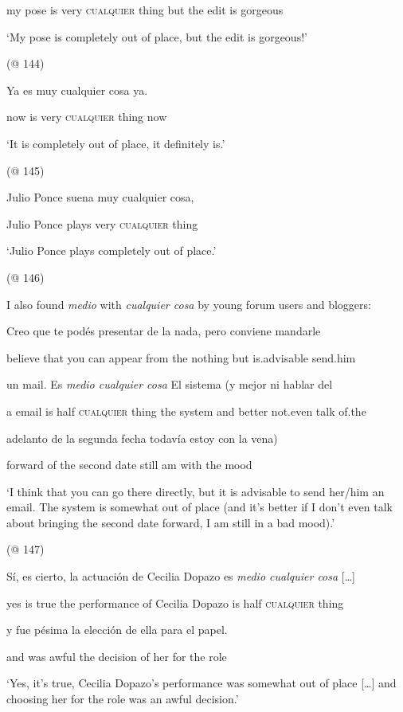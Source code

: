 \documentclass[output=paper]{langscibook}
\begin{document}
    my  pose  is  very  \textsc{cualquier}  thing  but  the  edit  is  gorgeous

    ‘My pose is completely out of place, but the edit is gorgeous!’

    (@ 144)

    Ya  es  muy  cualquier  cosa  ya.

    now  is  very  \textsc{cualquier}  thing  now

    ‘It is completely out of place, it definitely is.’

    (@ 145)

    Julio Ponce  suena  muy  cualquier  cosa,

    Julio Ponce  plays  very  \textsc{cualquier}  thing

    ‘Julio Ponce plays completely out of place.’

    (@ 146)

I also found \textit{medio} with \textit{cualquier cosa} by young forum users and bloggers:

    Creo  que  te  podés  presentar  de  la  nada,  pero  conviene  mandarle

    believe  that  you  can  appear  from  the  nothing  but  is.advisable  send.him

    un  mail.  Es  \textit{medio  cualquier  cosa} El  sistema  (y  mejor  ni  hablar  del

    a  email  is  half  \textsc{cualquier}  thing  the  system  and  better  not.even  talk  of.the

    adelanto  de  la  segunda  fecha  todavía  estoy  con  la  vena)

    forward  of  the  second  date  still  am  with  the  mood

    ‘I think that you can go there directly, but it is advisable to send her/him an email. The system is somewhat out of place (and it’s better if I don’t even talk about bringing the second date forward, I am still in a bad mood).’

    (@ 147)

    Sí,  es  cierto,  la  actuación  de  Cecilia  Dopazo  es  \textit{medio  cualquier  cosa} […]

    yes  is  true  the  performance  of  Cecilia  Dopazo  is  half  \textsc{cualquier}  thing  

    y  fue  pésima  la  elección  de  ella  para  el  papel.

    and  was  awful  the  decision  of  her  for  the  role

    ‘Yes, it’s true, Cecilia Dopazo’s performance was somewhat out of place […] and choosing her for the role was an awful decision.’
\end{document}
